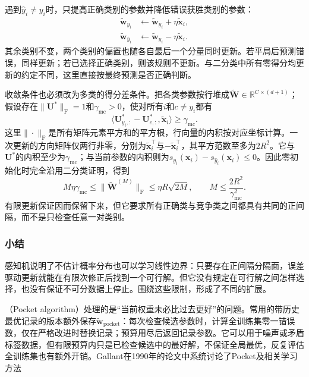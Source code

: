 遇到$\hat y_i\ne y_i$时，只提高正确类别的参数并降低错误获胜类别的参数：
\begin{equation}
  \label{eq:classification-perceptron-multiclass-update}
  \begin{aligned}
    \tilde{\bm{w}}_{y_i}
      &\leftarrow\tilde{\bm{w}}_{y_i}+\eta\tilde{\bm{x}}_i,\\
    \tilde{\bm{w}}_{\hat y_i}
      &\leftarrow\tilde{\bm{w}}_{\hat y_i}-\eta\tilde{\bm{x}}_i .
  \end{aligned}
\end{equation}
其余类别不变，两个类别的偏置也随各自最后一个分量同时更新。若平局后预测错误，同样更新；若已选择正确类别，则该规则不更新。与二分类中所有零得分均更新的约定不同，这里直接按最终预测是否正确判断。

收敛条件也必须改为多类的得分差条件。把各类参数按行堆成$\tilde{\bm{W}}\in\mathbb{R}^{C\times(d+1)}$；假设存在$\|\bm{U}^\ast\|_{\mathrm{F}}=1$和$\gamma_{\mathrm{mc}}>0$，使对所有$i$和$c\ne y_i$都有
\[
  \langle\bm{U}_{y_i,:}^\ast-\bm{U}_{c,:}^\ast,
    \tilde{\bm{x}}_i\rangle\geq\gamma_{\mathrm{mc}} .
\]
这里$\|\cdot\|_{\mathrm{F}}$是所有矩阵元素平方和的平方根，行向量的内积按对应坐标计算。一次更新的方向矩阵仅两行非零，分别为$\tilde{\bm{x}}_i^{\top}$与$-\tilde{\bm{x}}_i^{\top}$，其平方范数至多为$2R^2$。它与$\bm{U}^\ast$的内积至少为$\gamma_{\mathrm{mc}}$；与当前参数的内积则为$s_{y_i}(\bm{x}_i)-s_{\hat y_i}(\bm{x}_i)\leq0$。因此零初始化时完全沿用二分类证明，得到
\[
  M\eta\gamma_{\mathrm{mc}}
    \leq\|\tilde{\bm{W}}^{(M)}\|_{\mathrm{F}}
    \leq\eta R\sqrt{2M},
  \qquad
  M\leq\frac{2R^2}{\gamma_{\mathrm{mc}}^2}.
\]
有限更新保证因而保留下来，但它要求所有正确类与竞争类之间都具有共同的正间隔，而不是只检查任意一对类别。

\subsubsection{小结}
\label{sec:classification-perceptron-summary}

感知机说明了不估计概率分布也可以学习线性边界：只要存在正间隔分隔面，误差驱动更新就能在有限次修正后找到一个可行解。但它没有规定在可行解之间怎样选择，也没有保证不可分数据上停止。围绕这些限制，形成了不同的扩展。

（Pocket algorithm）处理的是“当前权重未必比过去更好”的问题。常用的带历史最优记录的版本额外保存$\tilde{\bm{w}}_{\mathrm{pocket}}$：每次检查候选参数时，计算全训练集零一错误数，仅在严格改进时替换记录；预算用尽后返回记录参数。它可以用于噪声或矛盾标签数据，但有限预算内只是已检查候选中的最好解，不保证全局最优，反复评估全训练集也有额外开销。Gallant在1990年的论文中系统讨论了Pocket及相关学习方法


